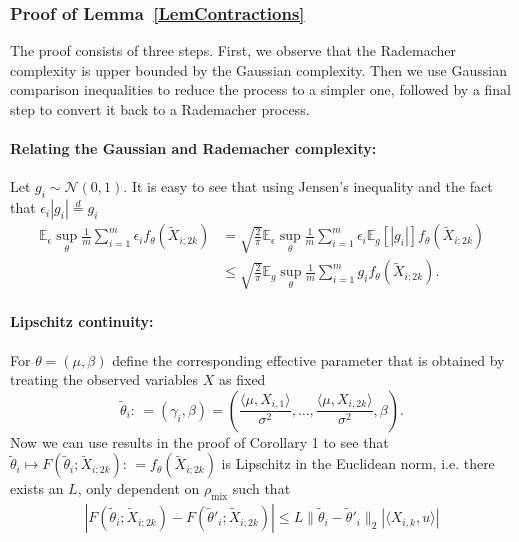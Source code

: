 \documentclass[twoside,11pt]{article}
\newcommand{\NORMAL}{\ensuremath{\mathcal{N}}}
\def\EE{ \mathbb{E} }
\newcommand{\norm}[1]{\ensuremath{\|#1\|_2}}
\newcommand{\mixcoef}{\ensuremath{\rho_{\mathrm{mix}}}}
\newcommand{\paramobs}{\mu}
\newcommand{\paramtrans}{\beta}
\newcommand{\paramjoint}{\theta}
\newcommand{\paramgamma}{\gamma}
\newcommand{\defn}{: \, = }
\newcommand{\Xtil}{\ensuremath{\widetilde{X}}}
\newcommand{\funcproc}{f_{\paramjoint}}
\newcommand{\funcprocgamma}[1]{F(#1;\blockXi)}
\newcommand{\blockXi}{\Xtil_{i;2k}}
\newcommand{\lipcont}{\ensuremath{L}}
\newcommand{\paramjointgamma}{\tilde{\paramjoint}}
\begin{document}

\subsubsection{Proof of Lemma~\ref{LemContractions}}

The proof consists of three steps. First, we observe that the
Rademacher complexity is upper bounded by the Gaussian
complexity. Then we use Gaussian comparison inequalities to reduce the
process to a simpler one, followed by a final step to convert it back
to a Rademacher process.


\paragraph{Relating the Gaussian and Rademacher complexity:}

Let $g_i \sim \NORMAL(0,1)$. It is easy to see that using Jensen's
inequality and the fact that $\epsilon_i |g_i| \overset{d}{=} g_i$
\begin{align*}
\EE_{\epsilon} \sup_{\paramjoint} \frac{1}{m} \sum_{i=1}^m \epsilon_i
\funcproc(\blockXi) &= \sqrt{\frac{2}{\pi}} \EE_{\epsilon}
\sup_{\paramjoint} \frac{1}{m} \sum_{i=1}^m \epsilon_i \EE_g[|g_i|]
\funcproc(\blockXi)\\ 
%
& \leq \sqrt{\frac{2}{\pi}} \EE_{g} \sup_{\paramjoint}\frac{1}{m}
\sum_{i=1}^m g_i \funcproc(\blockXi).
\end{align*}

\paragraph{Lipschitz continuity:}
For $\paramjoint = (\mu,\beta)$ define the corresponding effective
parameter that is obtained by treating the observed variables 
$X$ as fixed
\begin{equation}
\paramjointgamma_i \defn (\paramgamma_i, \paramtrans) = (\frac{\langle
  \paramobs, X_{i,1} \rangle}{\sigma^2}, \dots,
\frac{\langle\paramobs, X_{i,2k}\rangle}{\sigma^2}, \paramtrans).
\end{equation}
Now we can use results in the proof of Corollary 1 to see that
$\paramjointgamma_i \mapsto \funcprocgamma{\paramjointgamma_i} \defn
\funcproc(\blockXi)$ is Lipschitz in the Euclidean norm, i.e. there
exists an $\lipcont$, only dependent on $\mixcoef$ such that
\begin{align}
\label{EqnLipschitz}
|\funcprocgamma{\paramjointgamma_i} -
\funcprocgamma{\paramjointgamma'_i}| \leq \lipcont
\norm{\paramjointgamma_i- \paramjointgamma'_i} |\langle X_{i,k}
,u\rangle|
\end{align}
\end{document}

